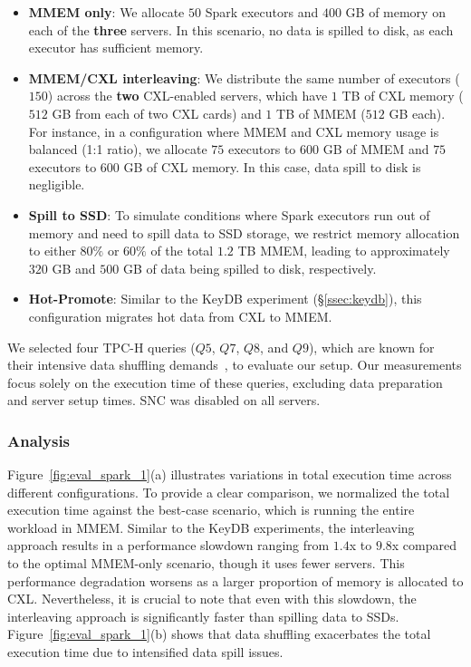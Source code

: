 \begin{itemize}
  \item \textbf{MMEM only}: We allocate $50$ Spark executors and $400$ GB of memory on each of the \textbf{three} servers. In this scenario, no data is spilled to disk, as each executor has sufficient memory.
  
  \item \textbf{MMEM/CXL interleaving}: We distribute the same number of executors ($150$) across the \textbf{two} CXL-enabled servers, which have $1$ TB of CXL memory ($512$ GB from each of two CXL cards) and $1$ TB of MMEM ($512$ GB each). For instance, in a configuration where MMEM and CXL memory usage is balanced (1:1 ratio), we allocate $75$ executors to $600$ GB of MMEM and $75$ executors to $600$ GB of CXL memory. In this case, data spill to disk is negligible.
  
  \item \textbf{Spill to SSD}: To simulate conditions where Spark executors run out of memory and need to spill data to SSD storage, we restrict memory allocation to either $80\%$ or $60\%$ of the total $1.2$ TB MMEM, leading to approximately $320$ GB and $500$ GB of data being spilled to disk, respectively.
  
  \item \textbf{Hot-Promote}: Similar to the KeyDB experiment (\S\ref{ssec:keydb}), this configuration migrates hot data from CXL to MMEM.
\end{itemize}

We selected four TPC-H queries ($Q5$, $Q7$, $Q8$, and $Q9$), which are known for their intensive data shuffling demands~\cite{PSACS}, to evaluate our setup. Our measurements focus solely on the execution time of these queries, excluding data preparation and server setup times. SNC was disabled on all servers.

\subsubsection{Analysis}

Figure~\ref{fig:eval_spark_1}(a) illustrates variations in total execution time across different configurations. To provide a clear comparison, we normalized the total execution time against the best-case scenario, which is running the entire workload in MMEM. Similar to the KeyDB experiments, the interleaving approach results in a performance slowdown ranging from $1.4$x to $9.8$x compared to the optimal MMEM-only scenario, though it uses fewer servers. This performance degradation worsens as a larger proportion of memory is allocated to CXL. Nevertheless, it is crucial to note that even with this slowdown, the interleaving approach is significantly faster than spilling data to SSDs. Figure~\ref{fig:eval_spark_1}(b) shows that data shuffling exacerbates the total execution time due to intensified data spill issues.

